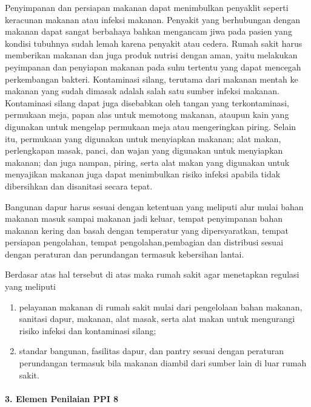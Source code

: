 \documentclass[
]{book}
\providecommand{\tightlist}{%
  \setlength{\itemsep}{0pt}\setlength{\parskip}{0pt}}
\begin{document}
Penyimpanan dan persiapan makanan dapat menimbulkan penyaklit seperti keracunan makanan atau infeksi makanan. Penyakit yang berhubungan dengan makanan dapat sangat berbahaya bahkan mengancam jiwa pada pasien yang kondisi tubuhnya sudah lemah karena penyakit atau cedera. Rumah sakit harus memberikan makanan dan juga produk nutrisi dengan aman, yaitu melakukan peyimpanan dan penyiapan makanan pada suhu tertentu yang dapat mencegah perkembangan bakteri. Kontaminasi silang, terutama dari makanan mentah ke makanan yang sudah dimasak adalah salah satu sumber infeksi makanan. Kontaminasi silang dapat juga disebabkan oleh tangan yang terkontaminasi, permukaan meja, papan alas untuk memotong makanan, ataupun kain yang digunakan untuk mengelap permukaan meja atau mengeringkan piring. Selain itu, permukaan yang digunakan untuk menyiapkan makanan; alat makan, perlengkapan masak, panci, dan wajan yang digunakan untuk menyiapkan makanan; dan juga nampan, piring, serta alat makan yang digunakan untuk menyajikan makanan juga dapat menimbulkan risiko infeksi apabila tidak dibersihkan dan disanitasi secara tepat.

Bangunan dapur harus sesuai dengan ketentuan yang meliputi alur mulai bahan makanan masuk sampai makanan jadi keluar, tempat penyimpanan bahan makanan kering dan basah dengan temperatur yang dipersyaratkan, tempat persiapan pengolahan, tempat pengolahan,pembagian dan distribusi sesuai dengan peraturan dan perundangan termasuk kebersihan lantai.

Berdasar atas hal tersebut di atas maka rumah sakit agar menetapkan regulasi yang meliputi

\begin{enumerate}
\def\labelenumi{\alph{enumi}.}
\tightlist
\item
  pelayanan makanan di rumah sakit mulai dari pengelolaan bahan makanan, sanitasi dapur, makanan, alat masak, serta alat makan untuk mengurangi risiko infeksi dan kontaminasi silang;
\item
  standar bangunan, fasilitas dapur, dan pantry sesuai dengan peraturan perundangan termasuk bila makanan diambil dari sumber lain di luar rumah sakit.
\end{enumerate}

\hypertarget{elemen-penilaian-ppi-8}{%
\paragraph*{3. Elemen Penilaian PPI 8}\label{elemen-penilaian-ppi-8}}
\end{document}

